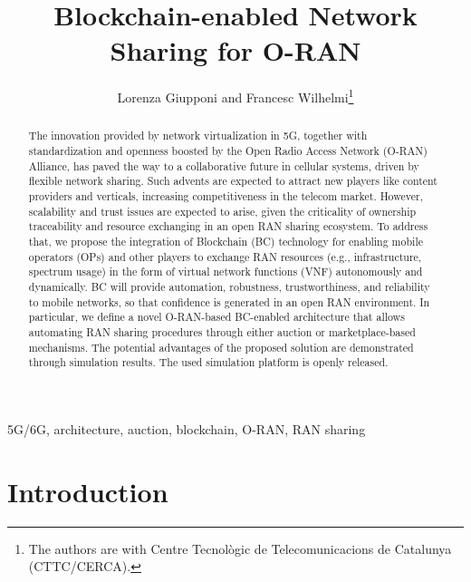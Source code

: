 \documentclass[journal]{IEEEtran}
\title{Blockchain-enabled Network Sharing for O-RAN}
\author{Lorenza Giupponi and Francesc Wilhelmi\thanks{The authors are with Centre Tecnol\`ogic de Telecomunicacions de Catalunya (CTTC/CERCA).}}
\begin{document}
\maketitle

\begin{abstract}
The innovation provided by network virtualization in 5G, together with standardization and openness boosted by the Open Radio Access Network (O-RAN) Alliance, has paved the way to a collaborative future in cellular systems, driven by flexible network sharing. Such advents are expected to attract new players like content providers and verticals, increasing competitiveness in the telecom market. However, scalability and trust issues are expected to arise, given the criticality of ownership traceability and resource exchanging in an open RAN sharing ecosystem. To address that, we propose the integration of Blockchain (BC) technology for enabling mobile operators (OPs) and other players to exchange RAN resources (e.g., infrastructure, spectrum usage) in the form of virtual network functions (VNF) autonomously and dynamically. BC will provide automation, robustness, trustworthiness, and reliability to mobile networks, so that confidence is generated in an open RAN environment. In particular, we define a novel O-RAN-based BC-enabled architecture that allows automating RAN sharing procedures through either auction or marketplace-based mechanisms. The potential advantages of the proposed solution are demonstrated through simulation results. The used simulation platform is openly released. 
\end{abstract}

\begin{IEEEkeywords}
5G/6G, architecture, auction, blockchain, O-RAN, RAN sharing
\end{IEEEkeywords}

\IEEEpeerreviewmaketitle

\section{Introduction}
\end{document}
